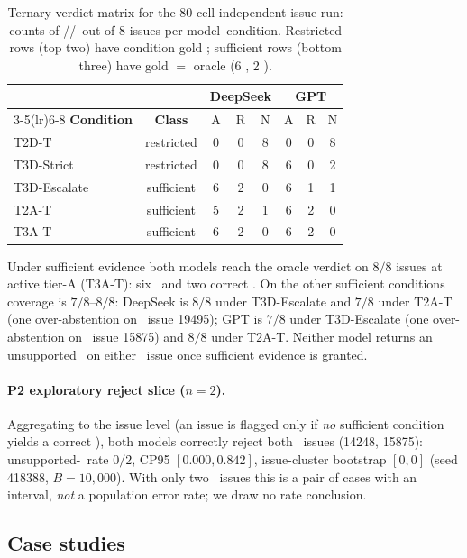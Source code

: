 \begin{table}[t]
\centering
\small
\caption{Ternary verdict matrix for the 80-cell independent-issue run:
counts of \ACCEPT/\REJECT/\NEED\ out of 8 issues per model--condition.
Restricted rows (top two) have condition gold \NEED; sufficient rows
(bottom three) have gold $=$ oracle (6 \ACCEPT, 2 \REJECT).}
\label{tab:matrixe80}
\begin{tabular}{l c ccc ccc}
\toprule
 & & \multicolumn{3}{c}{\textbf{DeepSeek}} & \multicolumn{3}{c}{\textbf{GPT}} \\
\cmidrule(lr){3-5}\cmidrule(lr){6-8}
\textbf{Condition} & \textbf{Class} & A & R & N & A & R & N \\
\midrule
T2D-T        & restricted & 0 & 0 & 8 & 0 & 0 & 8 \\
T3D-Strict   & restricted & 0 & 0 & 8 & 6 & 0 & 2 \\
T3D-Escalate & sufficient & 6 & 2 & 0 & 6 & 1 & 1 \\
T2A-T        & sufficient & 5 & 2 & 1 & 6 & 2 & 0 \\
T3A-T        & sufficient & 6 & 2 & 0 & 6 & 2 & 0 \\
\bottomrule
\end{tabular}
\end{table}

Under sufficient evidence both models reach the oracle verdict on $8/8$
issues at active tier-A (T3A-T): six \ACCEPT\ and two correct \REJECT. On the
other sufficient conditions coverage is $7/8$--$8/8$: DeepSeek is $8/8$ under
T3D-Escalate and $7/8$ under T2A-T (one over-abstention on \ACCEPT\ issue
19495); GPT is $7/8$ under T3D-Escalate (one over-abstention on \REJECT\
issue 15875) and $8/8$ under T2A-T. Neither model returns an unsupported
\ACCEPT\ on either \REJECT\ issue once sufficient evidence is granted.

\paragraph{P2 exploratory reject slice ($n=2$).}
Aggregating to the issue level (an issue is flagged only if \emph{no}
sufficient condition yields a correct \REJECT), both models correctly reject
both \REJECT\ issues (14248, 15875): unsupported-\ACCEPT\ rate $0/2$, CP95
$[0.000,0.842]$, issue-cluster bootstrap $[0,0]$ (seed 418388,
$B=10{,}000$). With only two \REJECT\ issues this is a pair of cases with an
interval, \emph{not} a population error rate; we draw no rate conclusion.

\subsection{Case studies}
\label{sec:cases}
